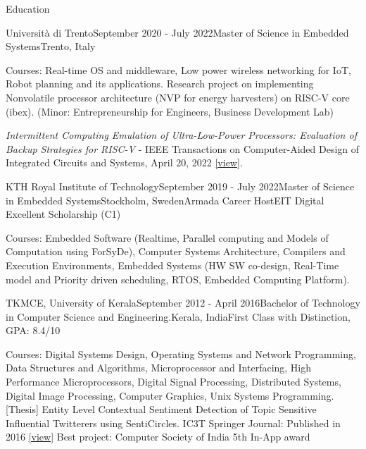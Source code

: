 \documentclass[
	a4paper, %
	11pt, %
]{resume} %
\begin{document}

\begin{rSection}{Education}
    \begin{rSubsection}{Università di Trento}{September 2020 - July 2022}{Master of Science in Embedded Systems}{Trento, Italy}

        Courses: Real-time OS and middleware, Low power wireless networking for IoT, Robot planning and its applications. Research project on implementing Nonvolatile processor architecture (NVP for energy harvesters) on RISC-V core (ibex). (Minor: Entrepreneurship for Engineers, Business Development Lab)
    
        {\color{orange}\emph{Intermittent Computing Emulation of Ultra-Low-Power Processors: Evaluation of Backup Strategies for RISC-V} - IEEE Transactions on Computer-Aided Design of Integrated Circuits and Systems, April 20, 2022} \href{https://ieeexplore.ieee.org/document/9760506}{[view]}.
    \end{rSubsection}

    \begin{rSubsection6}{KTH Royal Institute of Technology}{September 2019 - July 2022}{Master of Science in Embedded Systems}{Stockholm, Sweden}{Armada Career Host}{EIT Digital Excellent Scholarship (C1)}

        Courses: Embedded Software (Realtime, Parallel computing and Models of Computation using ForSyDe), Computer Systems Architecture, Compilers and Execution Environments, Embedded Systems (HW SW co-design, Real-Time model and Priority driven scheduling, RTOS, Embedded Computing Platform).
    \end{rSubsection6}
    
    \begin{rSubsection5}{TKMCE, University of Kerala}{September 2012 - April 2016}{Bachelor of Technology in Computer Science and Engineering.}{Kerala, India}{First Class with Distinction, GPA: 8.4/10}

        Courses: Digital Systems Design, Operating Systems and Network Programming, Data Structures and Algorithms, Microprocessor and Interfacing, High Performance Microprocessors, Digital Signal Processing, Distributed Systems, Digital Image Processing, Computer Graphics, Unix Systems Programming.\hfill
        \bigskip\break
        {\color{orange}[Thesis] Entity Level Contextual Sentiment Detection of Topic Sensitive Influential Twitterers using SentiCircles. \break
        IC3T Springer Journal: Published in 2016 \href{https://link.springer.com/chapter/10.1007/978-981-10-3223-3\_19}{[view]}\hfill \break
        Best project: Computer Society of India 5th In-App award} \hfill

    
    \end{rSubsection5}
    
		
\end{rSection}
\end{document}
